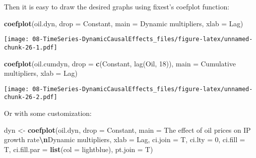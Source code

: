\documentclass[
]{article}
\newenvironment{Shaded}{\begin{snugshade}}{\end{snugshade}}
\newcommand{\AttributeTok}[1]{\textcolor[rgb]{0.13,0.29,0.53}{#1}}
\newcommand{\DecValTok}[1]{\textcolor[rgb]{0.00,0.00,0.81}{#1}}
\newcommand{\FunctionTok}[1]{\textcolor[rgb]{0.13,0.29,0.53}{\textbf{#1}}}
\newcommand{\NormalTok}[1]{#1}
\newcommand{\OtherTok}[1]{\textcolor[rgb]{0.56,0.35,0.01}{#1}}
\newcommand{\SpecialCharTok}[1]{\textcolor[rgb]{0.81,0.36,0.00}{\textbf{#1}}}
\newcommand{\StringTok}[1]{\textcolor[rgb]{0.31,0.60,0.02}{#1}}
\begin{document}
Then it is easy to draw the desired graphs using fixest's coefplot
function:

\begin{Shaded}
\begin{Highlighting}[]
\FunctionTok{coefplot}\NormalTok{(oil.dyn, }\AttributeTok{drop =} \StringTok{\textquotesingle{}Constant\textquotesingle{}}\NormalTok{,}
         \AttributeTok{main =} \StringTok{\textquotesingle{}Dynamic multipliers\textquotesingle{}}\NormalTok{, }\AttributeTok{xlab =} \StringTok{\textquotesingle{}Lag\textquotesingle{}}\NormalTok{)}
\end{Highlighting}
\end{Shaded}

\texttt{[image: 08-TimeSeries-DynamicCausalEffects\_files/figure-latex/unnamed-chunk-26-1.pdf]}

\begin{Shaded}
\begin{Highlighting}[]
\FunctionTok{coefplot}\NormalTok{(oil.cumdyn, }\AttributeTok{drop =} \FunctionTok{c}\NormalTok{(}\StringTok{\textquotesingle{}Constant\textquotesingle{}}\NormalTok{, }\StringTok{\textquotesingle{}lag(Oil, 18)\textquotesingle{}}\NormalTok{),}
         \AttributeTok{main =} \StringTok{\textquotesingle{}Cumulative multipliers\textquotesingle{}}\NormalTok{, }\AttributeTok{xlab =} \StringTok{\textquotesingle{}Lag\textquotesingle{}}\NormalTok{)}
\end{Highlighting}
\end{Shaded}

\texttt{[image: 08-TimeSeries-DynamicCausalEffects\_files/figure-latex/unnamed-chunk-26-2.pdf]}

Or with some customization:

\begin{Shaded}
\begin{Highlighting}[]
\NormalTok{dyn }\OtherTok{\textless{}{-}} \FunctionTok{coefplot}\NormalTok{(oil.dyn, }\AttributeTok{drop =} \StringTok{\textquotesingle{}Constant\textquotesingle{}}\NormalTok{,}
         \AttributeTok{main =} \StringTok{\textquotesingle{}The effect of oil prices on IP growth rate}\SpecialCharTok{\textbackslash{}n}\StringTok{Dynamic multipliers\textquotesingle{}}\NormalTok{,}
         \AttributeTok{xlab =} \StringTok{\textquotesingle{}Lag\textquotesingle{}}\NormalTok{,}
         \AttributeTok{ci.join =}\NormalTok{ T, }\AttributeTok{ci.lty =} \DecValTok{0}\NormalTok{, }\AttributeTok{ci.fill =}\NormalTok{ T, }\AttributeTok{ci.fill.par =} \FunctionTok{list}\NormalTok{(}\AttributeTok{col =} \StringTok{\textquotesingle{}lightblue\textquotesingle{}}\NormalTok{),}
         \AttributeTok{pt.join =}\NormalTok{ T)}
\end{Highlighting}
\end{Shaded}
\end{document}
